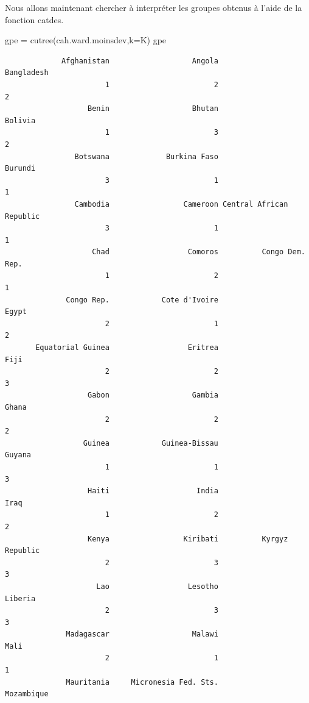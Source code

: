 \documentclass[
]{article}
\newenvironment{Shaded}{}{}
\newcommand{\AttributeTok}[1]{#1}
\newcommand{\FunctionTok}[1]{#1}
\newcommand{\NormalTok}[1]{#1}
\newcommand{\OtherTok}[1]{\textcolor[rgb]{1.00,0.25,0.00}{#1}}
\begin{document}
Nous allons maintenant chercher à interpréter les groupes obtenus à
l'aide de la fonction catdes.

\begin{Shaded}
\begin{Highlighting}[]
\NormalTok{gpe }\OtherTok{=} \FunctionTok{cutree}\NormalTok{(cah.ward.moinsdev,}\AttributeTok{k=}\NormalTok{K)}
\NormalTok{gpe}
\end{Highlighting}
\end{Shaded}

\begin{verbatim}
             Afghanistan                   Angola               Bangladesh 
                       1                        2                        2 
                   Benin                   Bhutan                  Bolivia 
                       1                        3                        2 
                Botswana             Burkina Faso                  Burundi 
                       3                        1                        1 
                Cambodia                 Cameroon Central African Republic 
                       3                        1                        1 
                    Chad                  Comoros          Congo Dem. Rep. 
                       1                        2                        1 
              Congo Rep.            Cote d'Ivoire                    Egypt 
                       2                        1                        2 
       Equatorial Guinea                  Eritrea                     Fiji 
                       2                        2                        3 
                   Gabon                   Gambia                    Ghana 
                       2                        2                        2 
                  Guinea            Guinea-Bissau                   Guyana 
                       1                        1                        3 
                   Haiti                    India                     Iraq 
                       1                        2                        2 
                   Kenya                 Kiribati          Kyrgyz Republic 
                       2                        3                        3 
                     Lao                  Lesotho                  Liberia 
                       2                        3                        3 
              Madagascar                   Malawi                     Mali 
                       2                        1                        1 
              Mauritania     Micronesia Fed. Sts.               Mozambique 

\end{verbatim}
\end{document}
